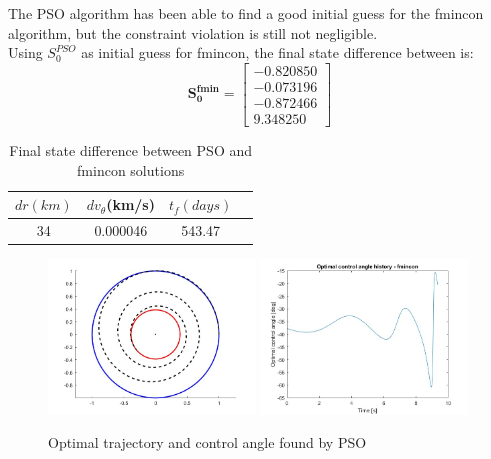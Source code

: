 \documentclass{report}
\begin{document}
The PSO algorithm has been able to find a good initial guess for the fmincon algorithm,  but the constraint violation is still not negligible.
\\
Using $S^{PSO}_0$ as initial guess for fmincon, the final state difference between is:
\begin{equation} 
    \boldsymbol{S^{fmin}_0 = \begin{bmatrix}
        -0.820850 \\
        -0.073196 \\
        -0.872466 \\
        9.348250 
    \end{bmatrix}}
\end{equation}
\begin{table}[h]
    \centering
    \begin{tabular}{|c|c|c|c|}
        \hline
        $dr(km)$ & $dv_\theta$(km/s) & $t_f(days)$  \\
        \hline
        34 & 0.000046 & 543.47 \\
        \hline
    \end{tabular}
    \caption{Final state difference between PSO and fmincon solutions}
\end{table}
\begin{figure}[h]
    \centering
    \includegraphics[width=0.49\textwidth]{results/fmincon_opt.jpg}
    \includegraphics[width=0.49\textwidth]{results/a_fmin.jpg}
    \caption{Optimal trajectory and control angle found by PSO}
\end{figure}\\
\end{document}
